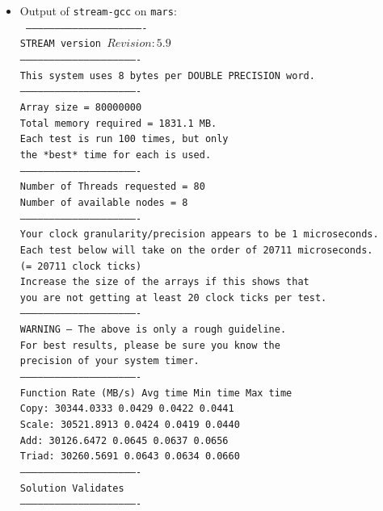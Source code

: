 \begin{itemize}
    \item Output of \texttt{stream-gcc} on \texttt{mars}: \\
    \texttt{\tiny 
------------------------------------------------------------- \\
STREAM version $Revision: 5.9 $ \\
------------------------------------------------------------- \\
This system uses 8 bytes per DOUBLE PRECISION word. \\
------------------------------------------------------------- \\
Array size = 80000000 \\
Total memory required = 1831.1 MB. \\
Each test is run 100 times, but only \\
the *best* time for each is used. \\
------------------------------------------------------------- \\
Number of Threads requested = 80 \\
Number of available nodes = 8 \\
------------------------------------------------------------- \\
Your clock granularity/precision appears to be 1 microseconds. \\
Each test below will take on the order of 20711 microseconds. \\
   (= 20711 clock ticks) \\
Increase the size of the arrays if this shows that \\
you are not getting at least 20 clock ticks per test. \\
------------------------------------------------------------- \\
WARNING -- The above is only a rough guideline. \\
For best results, please be sure you know the \\
precision of your system timer. \\
------------------------------------------------------------- \\
Function      Rate (MB/s)   Avg time     Min time     Max time \\
Copy:       30344.0333       0.0429       0.0422       0.0441 \\
Scale:      30521.8913       0.0424       0.0419       0.0440 \\
Add:        30126.6472       0.0645       0.0637       0.0656 \\
Triad:      30260.5691       0.0643       0.0634       0.0660 \\
------------------------------------------------------------- \\
Solution Validates \\
------------------------------------------------------------- \\
    }
\end{itemize}


